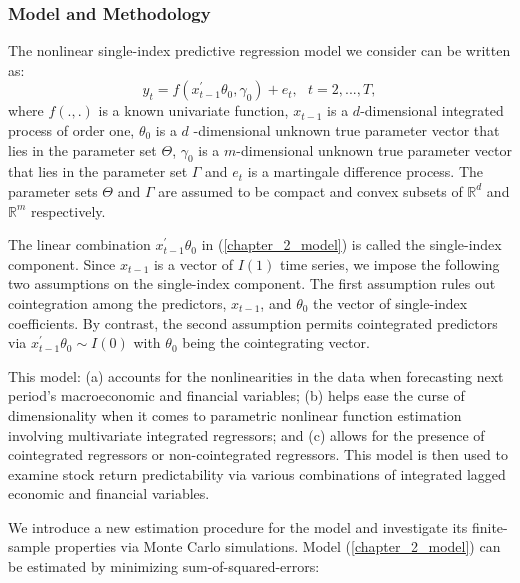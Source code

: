 \documentclass[a4paper,12pt,times,numbered,print,index]{report}
\numberwithin{equation}{section}
\begin{document}
\subsubsection*{Model and Methodology}
The nonlinear single-index predictive regression model we consider can be written as:
\begin{equation}
y_{t}=f\left( x_{t-1}^{\prime }\theta _{0},\gamma _{0}\right) +e_{t},\ \ \
t=2,...,T, 
\label{chapter_2_model}
\end{equation}
where $f\left( .,.\right) $ is a known univariate function, $x_{t-1}$ is a $d
$-dimensional integrated process of order one, $\theta _{0}$ is a $d$%
-dimensional unknown true parameter vector that lies in the parameter set $%
\Theta $, $\gamma _{0}$ is a $m$-dimensional unknown true parameter vector
that lies in the parameter set $\Gamma $ and $e_{t}$ is a martingale
difference process. The parameter sets $\Theta $ and $\Gamma $ are assumed
to be compact and convex subsets of $\mathbb{R}^{d}$ and $\mathbb{R}^{m}$
respectively.

The linear combination $x_{t-1}^{\prime }\theta _{0}$ in (\ref{chapter_2_model}) is
called the single-index component. Since $x_{t-1}$ is a vector of $I(1)$ time series, we impose the following two assumptions on the single-index component. The first assumption rules out cointegration among the predictors, $x_{t-1}$, and $\theta_{0}$ the vector of
single-index coefficients. By contrast, the second assumption permits cointegrated predictors via $x_{t-1}^{\prime }\theta _{0}\sim
I\left( 0\right) $ with $\theta _{0}$ being the cointegrating vector. 

This model: (a) accounts for the nonlinearities in the data when forecasting next period's macroeconomic and financial variables; (b) helps ease the curse of dimensionality when it comes to parametric nonlinear function estimation involving multivariate integrated regressors; and (c) allows for the presence of cointegrated regressors or non-cointegrated regressors. This model is then used to examine stock return predictability via various combinations of integrated lagged economic and financial variables.

We introduce a new estimation procedure for the model and investigate its finite-sample properties via Monte Carlo simulations. 
Model (\ref{chapter_2_model}) can be estimated by minimizing sum-of-squared-errors:
\end{document}
